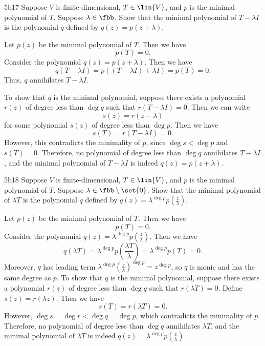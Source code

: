 \begin{exercise}{5b17}
    Suppose $V$ is finite-dimensional, $T \in \lin{V}$, and $p$ is the minimal polynomial of $T$.
	Suppose $\lambda \in \fbb$.
	Show that the minimal polynomial of $T - \lambda I$ is the polynomial $q$ defined by $q(z) = p(z + \lambda)$.
\end{exercise}

\begin{sol}
    Let $p(z)$ be the minimal polynomial of $T$.
    Then we have
    \[
    	p(T) = 0.
    \]
    Consider the polynomial $q(z) = p(z + \lambda)$.
    Then we have
    \[
    	q(T - \lambda I) = p((T - \lambda I) + \lambda I) = p(T) = 0.
    \]
    Thus, $q$ annihilates $T - \lambda I$.

    To show that $q$ is the minimal polynomial, suppose there exists a polynomial $r(z)$ of degree less than $\deg q$ such that $r(T - \lambda I) = 0$.
    Then we can write
    \[
    	s(z) = r(z - \lambda)
    \]
    for some polynomial $s(z)$ of degree less than $\deg p$.
    Then we have
    \[
    	s(T) = r(T - \lambda I) = 0.
    \]
    However, this contradicts the minimality of $p$, since $\deg s < \deg p$ and $s(T) = 0$.
    Therefore, no polynomial of degree less than $\deg q$ annihilates $T - \lambda I$, and the minimal polynomial of $T - \lambda I$ is indeed $q(z) = p(z + \lambda)$.
\end{sol}

\begin{exercise}{5b18}
    Suppose $V$ is finite-dimensional, $T \in \lin{V}$, and $p$ is the minimal polynomial of $T$.
	Suppose $\lambda \in \fbb \setminus \set{0}$.
	Show that the minimal polynomial of $\lambda T$ is the polynomial $q$ defined by $q(z) = \lambda^{\deg p} p (\frac{z}{\lambda})$.
\end{exercise}

\begin{sol}
    Let $p(z)$ be the minimal polynomial of $T$.
    Then we have
    \[
    	p(T) = 0.
    \]
    Consider the polynomial $q(z) = \lambda^{\deg p} p(\frac{z}{\lambda})$.
    Then we have
    \[
    	q(\lambda T) = \lambda^{\deg p} p\left(\frac{\lambda T}{\lambda}\right) = \lambda^{\deg p} p(T) = 0.
    \]
    Moreover, $q$ has leading term $\lambda^{\deg p}(\frac z{\lambda})^{\deg p} = z^{\deg p}$, so $q$ is monic and has the same degree as $p$.
    To show that $q$ is the minimal polynomial, suppose there exists a polynomial $r(z)$ of degree less than $\deg q$ such that $r(\lambda T) = 0$.
    Define $s(z) = r(\lambda z)$.
    Then we have
    \[
    	s(T) = r(\lambda T) = 0.
    \]
    However, $\deg s = \deg r < \deg q = \deg p$, which contradicts the minimality of $p$.
    Therefore, no polynomial of degree less than $\deg q$ annihilates $\lambda T$, and the minimal polynomial of $\lambda T$ is indeed $q(z) = \lambda^{\deg p} p(\frac{z}{\lambda})$.
\end{sol}


